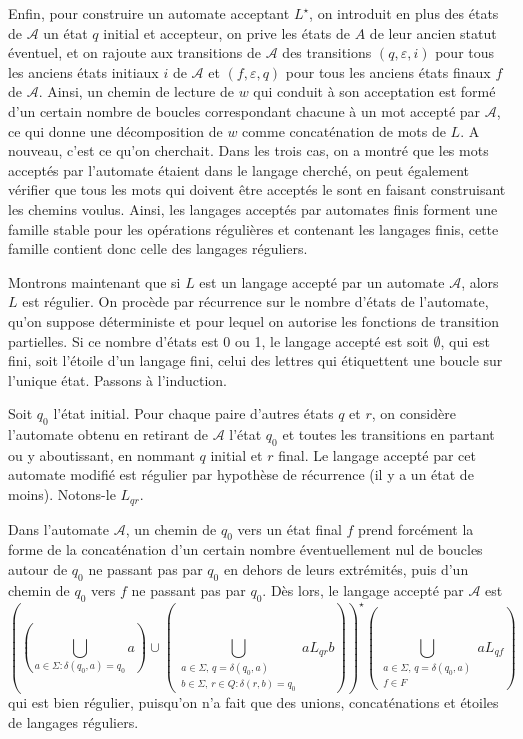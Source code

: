 \begin{preuve}
Enfin, pour construire un automate acceptant $L^\star$, on introduit en plus des états de $\mathcal{A}$ un état $q$ initial et accepteur, on prive les états de $A$ de leur ancien statut éventuel, et on rajoute aux transitions de $\mathcal{A}$ des transitions $(q,\varepsilon,i)$ pour tous les anciens états initiaux $i$ de $\mathcal{A}$ et $(f,\varepsilon,q)$ pour tous les anciens états finaux $f$ de $\mathcal{A}$. Ainsi, un chemin de lecture de $w$ qui conduit à son acceptation est formé d'un certain nombre de boucles correspondant chacune à un mot accepté par $\mathcal{A}$, ce qui donne une décomposition de $w$ comme concaténation de mots de $L$. A nouveau, c'est ce qu'on cherchait. Dans les trois cas, on a montré que les mots acceptés par l'automate étaient dans le langage cherché, on peut également vérifier que tous les mots qui doivent être acceptés le sont en faisant construisant les chemins voulus.
Ainsi, les langages acceptés par automates finis forment une famille stable pour les opérations régulières et contenant les langages finis, cette famille contient donc celle des langages réguliers.

Montrons maintenant que si $L$ est un langage accepté par un automate $\mathcal{A}$, alors $L$ est régulier. On procède par récurrence sur le nombre d'états de l'automate, qu'on suppose déterministe et pour lequel on autorise les fonctions de transition partielles. Si ce nombre d'états est 0 ou 1, le langage accepté est soit $\emptyset$, qui est fini, soit l'étoile d'un langage fini, celui des lettres qui étiquettent une boucle sur l'unique état. Passons à l'induction.

Soit $q_0$ l'état initial. Pour chaque paire d'autres états $q$ et $r$, on considère l'automate obtenu en retirant de $\mathcal{A}$ l'état $q_0$ et toutes les transitions en partant ou y aboutissant, en nommant $q$ initial et $r$ final. Le langage accepté par cet automate modifié est régulier par hypothèse de récurrence (il y a un état de moins). Notons-le $L_{qr}$.

Dans l'automate $\mathcal{A}$, un chemin de $q_0$ vers un état final $f$ prend forcément la forme de la concaténation d'un certain nombre éventuellement nul de boucles autour de $q_0$ ne passant pas par $q_0$ en dehors de leurs extrémités, puis d'un chemin de $q_0$ vers $f$ ne passant pas par $q_0$. Dès lors, le langage accepté par $\mathcal{A}$ est
\[
\left( (\bigcup_{a\in\Sigma : \delta(q_0,a)=q_0} a) \cup
(\bigcup_{\substack{a\in\Sigma,\,q=\delta(q_0,a)\\ b\in \Sigma,\, r\in Q: \delta(r,b)=q_0}} aL_{qr}b)
\right) ^\star
\left(
\bigcup_{\substack{a\in\Sigma,\, q=\delta(q_0,a)\\ f\in F}} aL_{qf}
\right)
\]
qui est bien régulier, puisqu'on n'a fait que des unions, concaténations et étoiles de langages réguliers.
\end{preuve}

